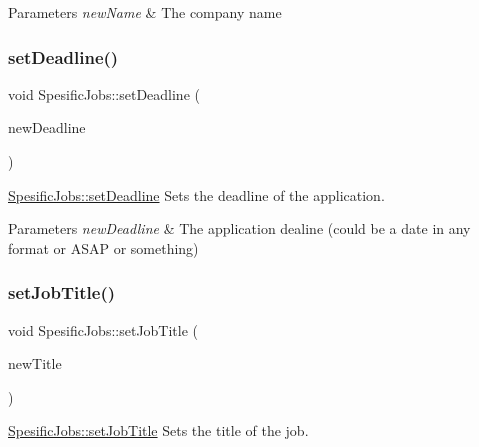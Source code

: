 \begin{DoxyParams}{Parameters}
{\em new\+Name} & The company name \\
\hline
\end{DoxyParams}
\mbox{\label{class_spesific_jobs_a80ceb9ead40dc83e0adcf6ed2b3d5465}} 
\subsubsection{\texorpdfstring{set\+Deadline()}{setDeadline()}}
{\footnotesize\ttfamily void Spesific\+Jobs\+::set\+Deadline (\begin{DoxyParamCaption}\item[{Q\+String}]{new\+Deadline }\end{DoxyParamCaption})}



\mbox{\hyperlink{class_spesific_jobs_a80ceb9ead40dc83e0adcf6ed2b3d5465}{Spesific\+Jobs\+::set\+Deadline}} Sets the deadline of the application. 


\begin{DoxyParams}{Parameters}
{\em new\+Deadline} & The application dealine (could be a date in any format or \textquotesingle{}A\+S\+AP\textquotesingle{} or something) \\
\hline
\end{DoxyParams}
\mbox{\label{class_spesific_jobs_abb4d8e45e0a2be8197ef03057fc5c714}} 
\subsubsection{\texorpdfstring{set\+Job\+Title()}{setJobTitle()}}
{\footnotesize\ttfamily void Spesific\+Jobs\+::set\+Job\+Title (\begin{DoxyParamCaption}\item[{Q\+String}]{new\+Title }\end{DoxyParamCaption})}



\mbox{\hyperlink{class_spesific_jobs_abb4d8e45e0a2be8197ef03057fc5c714}{Spesific\+Jobs\+::set\+Job\+Title}} Sets the title of the job. 



